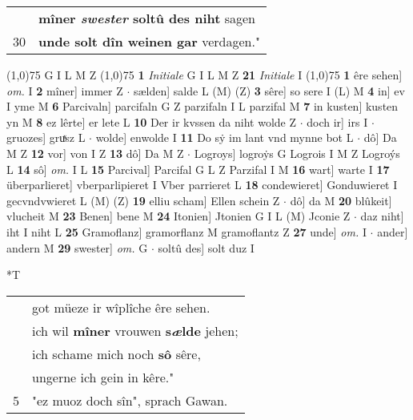 \documentclass[8pt,a4paper,notitlepage]{article}
\begin{document}
\begin{table}[ht]
\begin{minipage}[t]{0.5\linewidth}
\begin{tabular}{rl}
 & \textbf{mîner \textit{swester} soltû des niht} sagen\\ 
30 & \textbf{unde solt dîn weinen gar} verdagen."\\ 
\end{tabular}
\scriptsize
\line(1,0){75} \newline
G I L M Z \newline
\line(1,0){75} \newline
\textbf{1} \textit{Initiale} G I L M Z  \textbf{21} \textit{Initiale} I  \newline
\line(1,0){75} \newline
\textbf{1} êre sehen] \textit{om.} I \textbf{2} mîner] immer Z  $\cdot$ sælden] salde L (M) (Z) \textbf{3} sêre] so sere I (L) M \textbf{4} in] ev I yme M \textbf{6} Parcivaln] parcifaln G Z parzifaln I L parzifal M \textbf{7} in kusten] kusten yn M \textbf{8} ez lêrte] er lete L \textbf{10} Der ir kvssen da niht wolde Z  $\cdot$ doch ir] irs I  $\cdot$ gruozes] gruͯsz L  $\cdot$ wolde] enwolde I \textbf{11} Do sẏ im lant vnd mynne bot L  $\cdot$ dô] Da M Z \textbf{12} vor] von I Z \textbf{13} dô] Da M Z  $\cdot$ Logroys] logroẏs G Logrois I M Z Logroýs L \textbf{14} sô] \textit{om.} I L \textbf{15} Parcival] Parcifal G L Z Parzifal I M \textbf{16} wart] warte I \textbf{17} überparlieret] vberparlipieret I Vber parrieret L \textbf{18} condewieret] Gonduwieret I gecvndvwieret L (M) (Z) \textbf{19} elliu scham] Ellen schein Z  $\cdot$ dô] da M \textbf{20} blûkeit] vlucheit M \textbf{23} Benen] bene M \textbf{24} Itonien] Jtonien G I L (M) Jconie Z  $\cdot$ daz niht] iht I niht L \textbf{25} Gramoflanz] gramorflanz M gramoflantz Z \textbf{27} unde] \textit{om.} I  $\cdot$ ander] andern M \textbf{29} swester] \textit{om.} G  $\cdot$ soltû des] solt duz I \newline
\end{minipage}
\hspace{0.5cm}
\begin{minipage}[t]{0.5\linewidth}
\small
\begin{center}*T
\end{center}
\begin{tabular}{rl}
 & got müeze ir wîplîche êre sehen.\\ 
 & ich wil \textbf{mîner} vrouwen \textbf{s\textit{æ}lde} jehen;\\ 
 & ich schame mich noch \textbf{sô} sêre,\\ 
 & ungerne ich gein in kêre."\\ 
5 & "ez muoz doch sîn", sprach Gawan.\\ 

\end{tabular}
\end{minipage}
\end{table}
\end{document}
